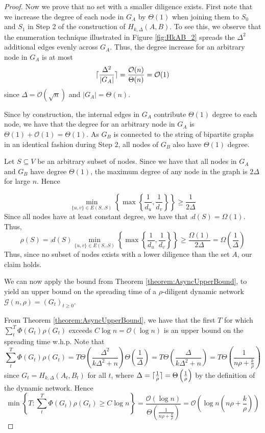 \begin{proof}
	Now we prove that no set with a smaller diligence exists. First note that we increase the degree of each node in $G_A$ by $\Theta(1)$ when joining them to $S_0$ and $S_1$ in Step 2 of the construction of $H_{k, \Delta}(A,B)$. To see this, we observe that the enumeration technique illustrated in Figure \ref{fig:HkAB_2} spreads the $\Delta^2$ additional edges evenly across $G_A$. Thus, the degree increase for an arbitrary node in $G_A$ is at most
	$$
		\lceil\frac{\Delta^2}{|G_A|}\rceil=\frac{\mathcal{O}(n)}{\Theta(n)} = \mathcal{O}(1)
	$$
	since $\Delta = \mathcal{O}(\sqrt{n})$ and $|G_A| = \Theta(n)$. 
	
	Since by construction, the internal edges in $G_A$ contribute $\Theta(1)$ degree to each node, we have that the degree for an arbitrary node in $G_A$ is $\Theta(1) + \mathcal{O}(1) = \Theta(1)$. As $G_B$ is connected to the string of bipartite graphs in an identical fashion during Step 2, all nodes of $G_B$ also have $\Theta(1)$ degree.  
	
	Let $S \subseteq V$ be an arbitrary subset of nodes. Since we have that all nodes in $G_A$ and $G_B$ have degree $\Theta(1)$, the maximum degree of any node in the graph is $2\Delta$ for large $n$. Hence 

	$$
	\min_{\{u, v\} \in E(S, \comp{S}) } \left\{ \max \left\{ \frac{1}{d_u},\frac{1}{d_v} \right\} \right\} \geq \frac{1}{2\Delta}
	$$
	Since all nodes have at least constant degree, we have that $\comp{d}(S) = \Omega(1)$. Thus, 
	$$
		\rho(S) 
		= \comp{d}(S) \min_{\{u, v\} \in E(S, \comp{S}) } \left\{ \max \left\{ \frac{1}{d_u},\frac{1}{d_v} \right\} \right\}
		\geq \frac{\Omega(1)}{2\Delta}
		= \Omega\left(\frac{1}{\Delta}\right)
	$$
	Thus, since no subset of nodes exists with a lower diligence than the set $A$, our claim holds.

	We can now apply the bound from Theorem \ref{theorem:AsyncUpperBound}, to yield an upper bound on the spreading time of a $\rho$-diligent dynamic network $\mathcal{G}(n, \rho) = (G_t)_{t\geq 0}$. 
	
	From Theorem \ref{theorem:AsyncUpperBound}, we have that the first $T$ for which $\sum_t^T \Phi(G_t)\rho(G_t)$ exceeds $C \log n = \mathcal{O}(\log n)$ is an upper bound on the spreading time w.h.p.  Note that 
	$$
		\sum_t^T \Phi(G_t)\rho(G_t)
		= 
		T \Theta\left(\frac{\Delta^2}{k\Delta^2 +n }\right) \Theta\left(\frac{1}{\Delta}\right)
		= 
		T \Theta\left(\frac{\Delta}{k\Delta^2 +n }\right)
		= 
		T \Theta\left(\frac{1}{n \rho + \frac{k}{\rho}}\right)
	$$
	since $G_t = H_{k, \Delta}(A_t,B_t)$ for all $t$, where $\Delta = \lceil\frac{1}{\rho}\rceil = \Theta\left(\frac{1}{\rho}\right)$ by the definition of the dynamic network. Hence 
	$$
		\min \left\{T : \sum_t^T \Phi(G_t)\rho(G_t) \geq C \log n \right\}
		=
		\frac{\mathcal{O}(\log n)}{\Theta\left(\frac{1}{n \rho + \frac{k}{\rho}}\right)}
		= 
		\mathcal{O}\left(\log n \left(n \rho + \frac{k}{\rho}\right)\right)
	$$
\end{proof}


